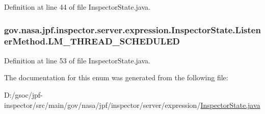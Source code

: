 Definition at line 44 of file Inspector\+State.\+java.

\subsubsection[{\texorpdfstring{L\+M\+\_\+\+T\+H\+R\+E\+A\+D\+\_\+\+S\+C\+H\+E\+D\+U\+L\+ED}{LM_THREAD_SCHEDULED}}]{\setlength{\rightskip}{0pt plus 5cm}gov.\+nasa.\+jpf.\+inspector.\+server.\+expression.\+Inspector\+State.\+Listener\+Method.\+L\+M\+\_\+\+T\+H\+R\+E\+A\+D\+\_\+\+S\+C\+H\+E\+D\+U\+L\+ED}\hypertarget{enumgov_1_1nasa_1_1jpf_1_1inspector_1_1server_1_1expression_1_1_inspector_state_1_1_listener_method_ab77324f053923649a5e664a1bd40852c}{}\label{enumgov_1_1nasa_1_1jpf_1_1inspector_1_1server_1_1expression_1_1_inspector_state_1_1_listener_method_ab77324f053923649a5e664a1bd40852c}


Definition at line 53 of file Inspector\+State.\+java.



The documentation for this enum was generated from the following file\+:\begin{DoxyCompactItemize}
\item 
D\+:/gsoc/jpf-\/inspector/src/main/gov/nasa/jpf/inspector/server/expression/\hyperlink{_inspector_state_8java}{Inspector\+State.\+java}\end{DoxyCompactItemize}
